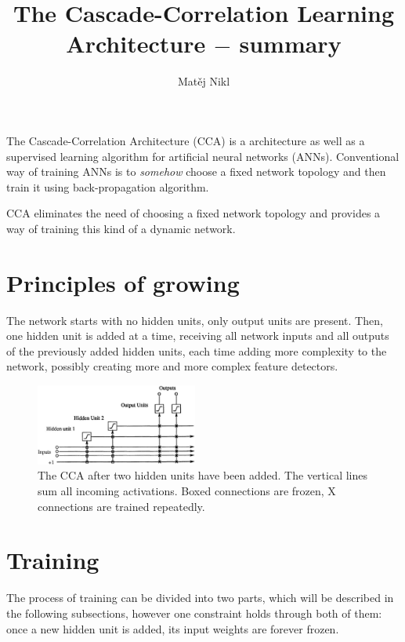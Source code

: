 \documentclass[a4paper,twocolumn]{article}
\title{The Cascade-Correlation Learning Architecture $-$ summary}
\author{Matěj Nikl}
\begin{document}
\maketitle
The Cascade-Correlation Architecture (CCA) is a architecture as well as a supervised learning algorithm for artificial neural networks (ANNs). Conventional way of training ANNs is to \textit{somehow} choose a fixed network topology and then train it using back-propagation algorithm.

CCA eliminates the need of choosing a fixed network topology and provides a way of training this kind of a dynamic network.

\section{Principles of growing}
The network starts with no hidden units, only output units are present. Then, one hidden unit is added at a time, receiving all network inputs and all outputs of the previously added hidden units, each time adding more complexity to the network, possibly creating more and more complex feature detectors.

\begin{figure}[!h]
    \includegraphics[width=0.475\textwidth]{cascade.png}
    \caption{The CCA after two hidden units have been added. The vertical lines sum all incoming activations. Boxed connections are frozen, X connections are trained repeatedly.}
\end{figure}

\section{Training}
The process of training can be divided into two parts, which will be described in the following subsections, however one constraint holds through both of them: once a new hidden unit is added, its input weights are forever frozen.
\end{document}

